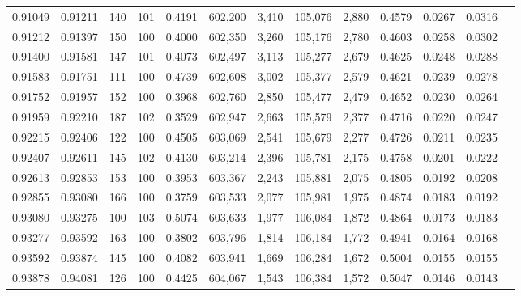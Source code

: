 \begin{tabular}{rrrrrrrrrrrrr}
0.91049 & 0.91211 &   140 & 101 &                                     0.4191 & 602,200 &   3,410 & 105,076 &   2,880 & 0.4579 & 0.0267 & 0.0316 \\
0.91212 & 0.91397 &   150 & 100 &                                     0.4000 & 602,350 &   3,260 & 105,176 &   2,780 & 0.4603 & 0.0258 & 0.0302 \\
0.91400 & 0.91581 &   147 & 101 &                                     0.4073 & 602,497 &   3,113 & 105,277 &   2,679 & 0.4625 & 0.0248 & 0.0288 \\
0.91583 & 0.91751 &   111 & 100 &                                     0.4739 & 602,608 &   3,002 & 105,377 &   2,579 & 0.4621 & 0.0239 & 0.0278 \\
0.91752 & 0.91957 &   152 & 100 &                                     0.3968 & 602,760 &   2,850 & 105,477 &   2,479 & 0.4652 & 0.0230 & 0.0264 \\
0.91959 & 0.92210 &   187 & 102 &                                     0.3529 & 602,947 &   2,663 & 105,579 &   2,377 & 0.4716 & 0.0220 & 0.0247 \\
0.92215 & 0.92406 &   122 & 100 &                                     0.4505 & 603,069 &   2,541 & 105,679 &   2,277 & 0.4726 & 0.0211 & 0.0235 \\
0.92407 & 0.92611 &   145 & 102 &                                     0.4130 & 603,214 &   2,396 & 105,781 &   2,175 & 0.4758 & 0.0201 & 0.0222 \\
0.92613 & 0.92853 &   153 & 100 &                                     0.3953 & 603,367 &   2,243 & 105,881 &   2,075 & 0.4805 & 0.0192 & 0.0208 \\
0.92855 & 0.93080 &   166 & 100 &                                     0.3759 & 603,533 &   2,077 & 105,981 &   1,975 & 0.4874 & 0.0183 & 0.0192 \\
0.93080 & 0.93275 &   100 & 103 &                                     0.5074 & 603,633 &   1,977 & 106,084 &   1,872 & 0.4864 & 0.0173 & 0.0183 \\
0.93277 & 0.93592 &   163 & 100 &                                     0.3802 & 603,796 &   1,814 & 106,184 &   1,772 & 0.4941 & 0.0164 & 0.0168 \\
0.93592 & 0.93874 &   145 & 100 &                                     0.4082 & 603,941 &   1,669 & 106,284 &   1,672 & 0.5004 & 0.0155 & 0.0155 \\
0.93878 & 0.94081 &   126 & 100 &                                     0.4425 & 604,067 &   1,543 & 106,384 &   1,572 & 0.5047 & 0.0146 & 0.0143 \\

\end{tabular}
